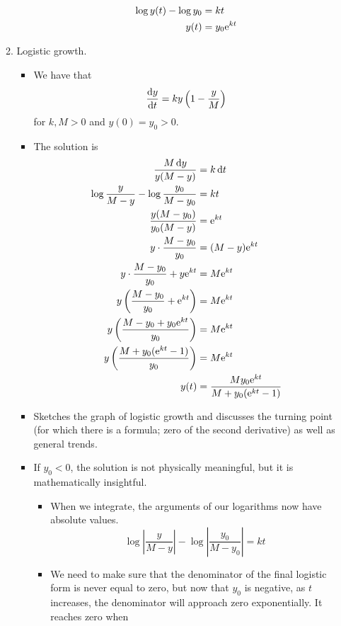 \documentclass[../notes.tex]{subfiles}
\begin{document}
\begin{itemize}
\begin{enumerate}
\begin{itemize}
\begin{align*}
                \log y(t)-\log y_0 &= kt\\
                y(t) &= y_0\e[kt]
            \end{align*}
        \end{itemize}
        \item Logistic growth.
        \begin{itemize}
            \item We have that
            \begin{equation*}
                \dv{y}{t} = ky\left( 1-\frac{y}{M} \right)
            \end{equation*}
            for $k,M>0$ and $y(0)=y_0>0$.
            \item The solution is
            \begin{align*}
                \frac{M\dd{y}}{y(M-y)} &= k\dd{t}\\
                \log\frac{y}{M-y}-\log\frac{y_0}{M-y_0} &= kt\\
                \frac{y(M-y_0)}{y_0(M-y)} &= \e[kt]\\
                y\cdot\frac{M-y_0}{y_0} &= (M-y)\e[kt]\\
                y\cdot\frac{M-y_0}{y_0}+y\e[kt] &= M\e[kt]\\
                y\left( \frac{M-y_0}{y_0}+\e[kt] \right) &= M\e[kt]\\
                y\left( \frac{M-y_0+y_0\e[kt]}{y_0} \right) &= M\e[kt]\\
                y\left( \frac{M+y_0(\e[kt]-1)}{y_0} \right) &= M\e[kt]\\
                y(t) &= \frac{My_0\e[kt]}{M+y_0(\e[kt]-1)}
            \end{align*}
            \item Sketches the graph of logistic growth and discusses the turning point (for which there is a formula; zero of the second derivative) as well as general trends.
            \item If $y_0<0$, the solution is not physically meaningful, but it is mathematically insightful.
            \begin{itemize}
                \item When we integrate, the arguments of our logarithms now have absolute values.
                \begin{equation*}
                    \log\left| \frac{y}{M-y} \right|-\log\left| \frac{y_0}{M-y_0} \right| = kt
                \end{equation*}
                \item We need to make sure that the denominator of the final logistic form is never equal to zero, but now that $y_0$ is negative, as $t$ increases, the denominator will approach zero exponentially. It reaches zero when

\end{itemize}
\end{itemize}
\end{enumerate}
\end{itemize}
\end{document}
